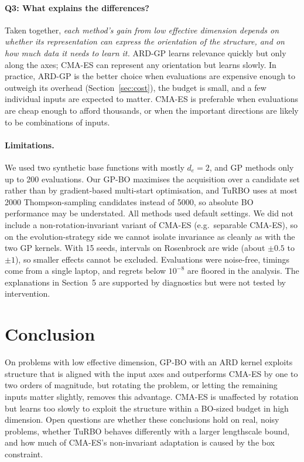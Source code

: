\documentclass[12pt]{article}
\begin{document}
\paragraph{Q3: What explains the differences?} Taken together, \emph{each method's gain from low effective
dimension depends on whether its representation can express the orientation of the structure, and on
how much data it needs to learn it.} ARD-GP learns relevance quickly but only along the axes; CMA-ES can
represent any orientation but learns slowly. In practice, ARD-GP is the better choice when evaluations are
expensive enough to outweigh its overhead (Section~\ref{sec:cost}), the budget is small, and a few
individual inputs are expected to matter. CMA-ES is preferable when evaluations are cheap enough to
afford thousands, or when the important directions are likely to be combinations of inputs.

\paragraph{Limitations.} We used two synthetic base functions with mostly $d_e=2$, and GP methods only
up to 200 evaluations. Our GP-BO maximises the acquisition over a candidate set rather than by
gradient-based multi-start optimisation, and TuRBO uses at most 2000 Thompson-sampling candidates
instead of 5000, so absolute BO performance may be understated. All methods used default settings.
We did not include a non-rotation-invariant variant of CMA-ES (e.g.\ separable CMA-ES), so on the
evolution-strategy side we cannot isolate invariance as cleanly as with the two GP kernels. With 15
seeds, intervals on Rosenbrock are wide (about $\pm0.5$ to $\pm1$), so smaller effects cannot be
excluded. Evaluations were noise-free, timings come from a single laptop, and regrets below
$10^{-8}$ are floored in the analysis. The explanations in Section~5 are supported by diagnostics but
were not tested by intervention.

\section{Conclusion}
On problems with low effective dimension, GP-BO with an ARD kernel exploits structure that is aligned
with the input axes and outperforms CMA-ES by one to two orders of magnitude, but rotating the problem,
or letting the remaining inputs matter slightly, removes this advantage. CMA-ES is unaffected by
rotation but learns too slowly to exploit the structure within a BO-sized budget in high dimension.
Open questions are whether these conclusions hold on real, noisy problems, whether TuRBO behaves
differently with a larger lengthscale bound, and how much of CMA-ES's non-invariant adaptation is
caused by the box constraint.
\end{document}
